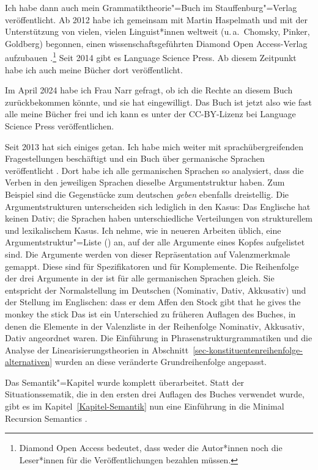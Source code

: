 Ich habe dann auch mein Grammatiktheorie"=Buch im Stauffenburg"=Verlag veröffentlicht. Ab 2012 habe
ich gemeinsam mit Martin Haspelmath und mit der Unterstützung von vielen, vielen Linguist*innen
weltweit (u.\,a.\ Chomsky, Pinker, Goldberg) begonnen, einen wissenschaftsgeführten Diamond Open
Access-Verlag aufzubauen \citep{MuellerOA}.\footnote{Diamond Open Access bedeutet, dass weder die Autor*innen noch die
Leser*innen für die Veröffentlichungen bezahlen müssen.} Seit 2014 gibt es Language Science Press. Ab diesem Zeitpunkt habe ich
auch meine Bücher dort veröffentlicht. 

Im April 2024 habe ich Frau Narr
gefragt, ob ich die Rechte an diesem Buch zurückbekommen könnte, und sie hat eingewilligt. Das Buch
ist jetzt also wie fast alle meine Bücher frei und ich kann es unter der CC-BY-Lizenz bei Language
Science Press veröffentlichen.

Seit 2013 hat sich einiges getan. Ich habe mich weiter mit sprachübergreifenden Fragestellungen
beschäftigt und ein Buch über germanische Sprachen veröffentlicht \citep{MuellerGermanic}. Dort habe
ich alle germanischen Sprachen so analysiert, dass die Verben in den jeweiligen Sprachen dieselbe
Argumentstruktur haben. Zum Beispiel sind die Gegenstücke zum deutschen \emph{geben} ebenfalls
dreistellig. Die Argumentstrukturen unterscheiden sich lediglich in den Kasus: Das Englische hat keinen
Dativ; die Sprachen haben unterschiedliche Verteilungen von strukturellem und lexikalischem
Kasus. Ich nehme, wie in neueren Arbeiten üblich, eine Argumentstruktur"=Liste (\argst) an, auf der 
alle Argumente eines Kopfes aufgelistet sind. Die Argumente werden von dieser Repräsentation auf
Valenzmerkmale gemappt. Diese sind \spr für Spezifikatoren und \comps für Komplemente. Die
Reihenfolge der drei Argumente in der \argst ist für alle germanischen Sprachen gleich. Sie
entspricht der Normalstellung im Deutschen (Nominativ, Dativ, Akkusativ) und der Stellung im
Englischen:
\eal
\ex dass er dem Affen den Stock gibt
\ex that he gives the monkey the stick
\zl
Das ist ein Unterschied zu früheren Auflagen des Buches, in denen die Elemente in der Valenzliste
\subcat in der Reihenfolge Nominativ, Akkusativ, Dativ angeordnet waren. Die Einführung in
Phrasenstrukturgrammatiken und die Analyse der Linearisierungstheorien in Abschnitt~\ref{sec-konstituentenreihenfolge-alternativen} wurden an
diese veränderte Grundreihenfolge angepasst.

Das Semantik"=Kapitel wurde komplett überarbeitet. Statt der Situationssematik, die in den ersten
drei Auf\/lagen des Buches verwendet wurde, gibt es im Kapitel~\ref{Kapitel-Semantik} nun eine
Einführung in die Minimal Recursion Semantics \citep*{CFPS2005a}.

